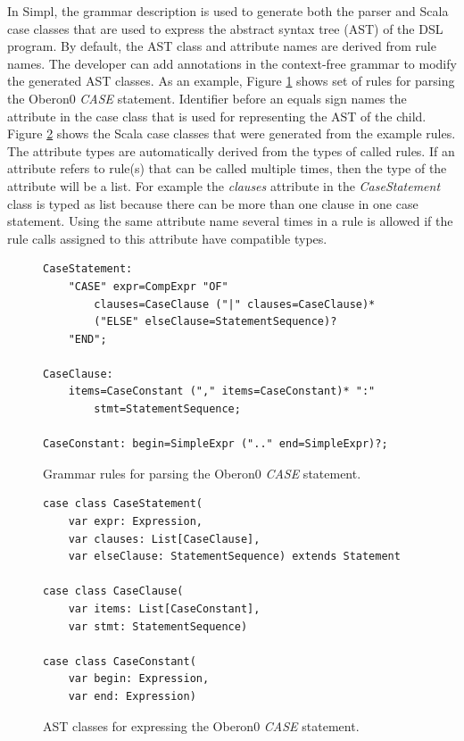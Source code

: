 In Simpl, the grammar description is used to generate both the parser
and Scala case classes that are used to express the abstract syntax
tree (AST) of the DSL program. By default, the AST class and attribute
names are derived from rule names. The developer can add annotations
in the context-free grammar to modify the generated AST classes. As
an example, Figure \ref{fig:case-statement} shows set of rules for
parsing the Oberon0 \emph{CASE} statement. Identifier before an equals
sign names the attribute in the case class that is used for representing
the AST of the child. Figure \ref{fig:Automatically-generated-AST}
shows the Scala case classes that were generated from the example
rules. The attribute types are automatically derived from the types
of called rules. If an attribute refers to rule(s) that can be called
multiple times, then the type of the attribute will be a list. For
example the \emph{clauses} attribute in the \emph{CaseStatement} class
is typed as list because there can be more than one clause in one
case statement. Using the same attribute name several times in a rule
is allowed if the rule calls assigned to this attribute have compatible
types.

\begin{figure}[!h]
{\small }
\begin{lstlisting}[basicstyle={\footnotesize\ttfamily}]
CaseStatement:
    "CASE" expr=CompExpr "OF"
        clauses=CaseClause ("|" clauses=CaseClause)*
        ("ELSE" elseClause=StatementSequence)?
    "END";

CaseClause:
    items=CaseConstant ("," items=CaseConstant)* ":"
        stmt=StatementSequence;

CaseConstant: begin=SimpleExpr (".." end=SimpleExpr)?;
\end{lstlisting}
{\small \par}

\caption{\label{fig:case-statement}Grammar rules for parsing the Oberon0 \emph{CASE}
statement.}
\end{figure}


\begin{figure}[!h]
{\small }
\begin{lstlisting}[basicstyle={\footnotesize\ttfamily}]
case class CaseStatement(
    var expr: Expression, 
    var clauses: List[CaseClause], 
    var elseClause: StatementSequence) extends Statement

case class CaseClause(
    var items: List[CaseConstant],
    var stmt: StatementSequence)

case class CaseConstant(
    var begin: Expression, 
    var end: Expression)
\end{lstlisting}
{\small \par}

\caption{\label{fig:Automatically-generated-AST}AST classes for expressing
the Oberon0 \emph{CASE }statement.}
\end{figure}


